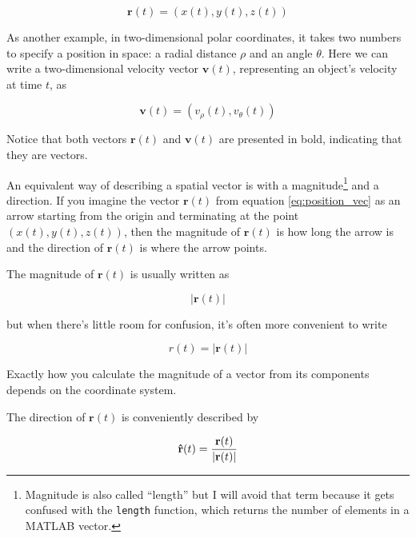 \documentclass[
]{book}
\numberwithin{Answer}{chapter}
\numberwithin{Exercise}{chapter}
\renewcommand{\vec}[1]{\bm{\mathbf{#1}}}
\newcommand{\uveci}{{\bm{\hat{\textnormal{\bfseries\i}}}}}
\newcommand{\uvecj}{{\bm{\hat{\textnormal{\bfseries\j}}}}}
\newcommand{\uvec}[1]{%
    \ifthenelse{\equal{#1}{i}}%
        {\uveci}{%
    \ifthenelse{\equal{#1}{j}}%
        {\uvecj}{%
    {\bm{\hat{\mathbf{#1}}}}%
}}}
\newcommand{\norm}[1]{\lvert #1 \rvert}
\begin{document}
\begin{equation}\label{eq:position_vec}
    \vec{r}(t) = (x(t), y(t), z(t))
\end{equation}

As another example, in two-dimensional polar coordinates, it takes two
numbers to specify a position in space: a radial distance $\rho$ and an
angle $\theta$. Here we can write a two-dimensional velocity vector
$\vec{v}(t)$, representing an object's velocity at time $t$, as

\begin{equation}
    \vec{v}(t) = (v_\rho(t),v_\theta(t))
\end{equation}

Notice that both vectors $\vec{r}(t)$ and $\vec{v}(t)$ are presented in bold,
indicating that they are vectors.

An equivalent way of describing a spatial vector is with a magnitude\footnote{
    Magnitude is also called ``length'' but I will avoid that term
    because it gets confused with the {\tt length} function, which
    returns the number of elements in a MATLAB vector.} and a
direction. If
you imagine the vector $\vec{r}(t)$ from equation
\eqref{eq:position_vec} as an arrow starting from the origin and
terminating at the point $(x(t),y(t),z(t))$, then the magnitude of
$\vec{r}(t)$ is how long the arrow is and the direction of $\vec{r}(t)$
is where the arrow points.

The magnitude of $\vec{r}(t)$ is usually written as

\begin{equation}\label{eq:vec_u_mag1}
    \norm{\vec{r}(t)}
\end{equation}

but when there's little room for confusion, it's often more convenient
to write

\begin{equation}\label{eq:vec_u_mag2}
    r(t) = \norm{\vec{r}(t)}
\end{equation}

Exactly how you calculate the magnitude of a vector from its components depends
on the coordinate system.

The direction of $\vec{r}(t)$ is conveniently described by

\begin{equation}\label{eq:vec_u_unit}
    \uvec{r}(t) = \frac{\vec{r}(t)}{\norm{\vec{r}(t)}}
\end{equation}
\end{document}
